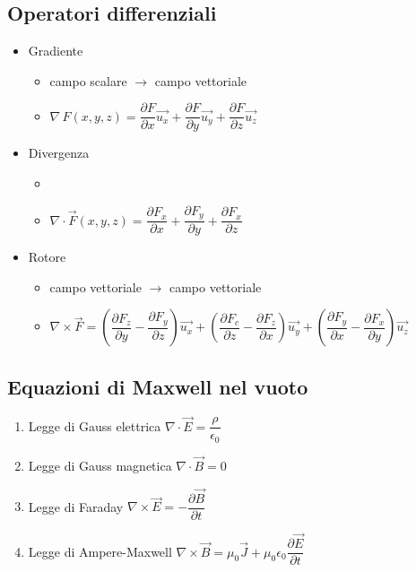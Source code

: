 \documentclass{article}
\begin{document}
\subsection{Operatori differenziali}
\begin{itemize}
	\item Gradiente
	\begin{itemize}
		\item campo scalare \(\rightarrow\) campo vettoriale
		\item \( \nabla \, F(x, y, z) = \dfrac{\partial F}{\partial x} \vec{u_x} +  \dfrac{\partial F}{\partial y} \vec{u_y} + \dfrac{\partial F}{\partial z} \vec{u_z}\)
	\end{itemize}
	\item Divergenza
	\begin{itemize}
		\item 
		\item \( \nabla \cdot \vec{F}(x, y, z) = \dfrac{\partial F_x}{\partial x} +  \dfrac{\partial F_y}{\partial y} + \dfrac{\partial F_x}{\partial z} \)
	\end{itemize}
	\item Rotore
	\begin{itemize}
		\item campo vettoriale \(\rightarrow\) campo vettoriale
		\item \( \nabla \times \vec{F} = \left( \dfrac{\partial F_z}{\partial y} -  \dfrac{\partial F_y}{\partial z} \right) \vec{u_x} + \left( \dfrac{\partial F_c}{\partial z} -  \dfrac{\partial F_z}{\partial x} \right) \vec{u_y} + \left( \dfrac{\partial F_y}{\partial x} -  \dfrac{\partial F_x}{\partial y} \right) \vec{u_z} \)
	\end{itemize}
\end{itemize}

\subsection{Equazioni di Maxwell nel vuoto}
\begin{enumerate}
	\item Legge di Gauss elettrica \( \nabla \cdot \vec{E} = \dfrac{\rho}{\epsilon_0} \)
	\item Legge di Gauss magnetica \( \nabla \cdot \vec{B} = 0 \)
	\item Legge di Faraday \( \nabla \times \vec{E} = - \dfrac{\partial \vec{B}}{\partial t} \)
	\item Legge di Ampere-Maxwell \( \nabla \times \vec{B} = \mu_0 \vec{J} + \mu_0 \epsilon_0 \dfrac{\partial \vec{E}}{\partial t} \)
\end{enumerate}
\end{document}
